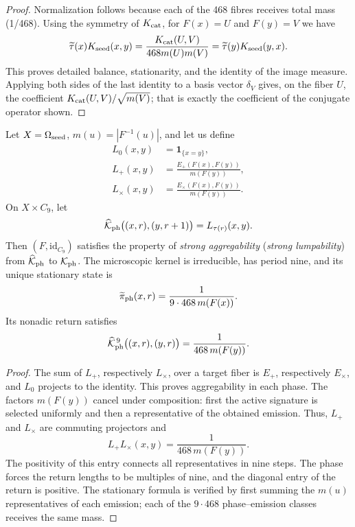 \begin{proof}
Normalization follows because each of the 468 fibres receives total mass
(1/468). Using the symmetry of \(K_{\rm cat}\), for
\(F(x)=U\) and \(F(y)=V\) we have
\[
 \widetilde\tau(x)K_{\rm seed}(x,y)
 =\frac{K_{\rm cat}(U,V)}{468m(U)m(V)}
 =\widetilde\tau(y)K_{\rm seed}(y,x).
\]
This proves detailed balance, stationarity, and the identity of the
image measure.
Applying both sides of the last identity to a basis vector
\(\delta_V\) gives, on the fiber \(U\), the coefficient
\(K_{\rm cat}(U,V)/\sqrt{m(V)}\); that is exactly the coefficient of the
conjugate operator shown.
\end{proof}

\begin{theorem}
\label{thm:elevacion-fase-semillas}
Let \(X=\Omega_{\rm seed}\), \(m(u)=|F^{-1}(u)|\), and let us define
\[
\begin{aligned}
 L_0(x,y)&=\mathbf1_{\{x=y\}},\\
 L_+(x,y)&=\frac{E_+(F(x),F(y))}{m(F(y))},\\
 L_\times(x,y)&=\frac{E_\times(F(x),F(y))}{m(F(y))}.
\end{aligned}
\]
On \(X\times C_9\), let
\[
 \widehat{\mathcal K}_{\rm ph}\bigl((x,r),(y,r+1)\bigr)
 =L_{\tau(r)}(x,y).
\]
Then \((F,\mathrm{id}_{C_9})\) satisfies the property of
\emph{strong aggregability} (\emph{strong lumpability}) from
\(\widehat{\mathcal K}_{\rm ph}\) to \(\mathcal K_{\rm ph}\). The microscopic
kernel is irreducible, has period nine, and its unique stationary state
is
\[
 \widetilde\pi_{\rm ph}(x,r)
 =\frac1{9\cdot468\,m(F(x))}.
\]
Its nonadic return satisfies
\[
 \widehat{\mathcal K}_{\rm ph}^{\,9}
 \bigl((x,r),(y,r)\bigr)
 =\frac1{468\,m(F(y))}.
\]
\end{theorem}

\begin{proof}
The sum of \(L_+\), respectively \(L_\times\), over a target fiber
is \(E_+\), respectively \(E_\times\), and \(L_0\) projects to the identity.
This proves aggregability in each phase. The factors \(m(F(y))\) cancel
under composition: first the active signature is selected uniformly and then a
representative of the obtained emission. Thus, \(L_+\) and \(L_\times\) are
commuting projectors and
\[
 L_+L_\times(x,y)=\frac1{468\,m(F(y))}.
\]
The positivity of this entry connects all representatives in nine
steps. The phase forces the return lengths to be multiples of nine,
and the diagonal entry of the return is positive. The stationary formula is
verified by first summing the \(m(u)\) representatives of each emission; each
of the \(9\cdot468\) phase--emission classes receives the same mass.
\end{proof}

